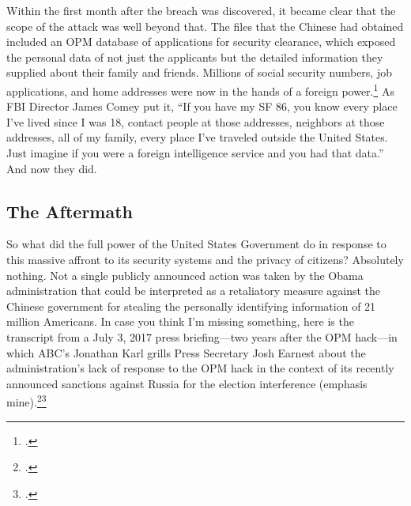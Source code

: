 \documentclass{report}
\begin{document}
\begin{refsegment}
Within the first month after the breach was discovered, it became clear that the scope of the attack was well beyond that. The files that the Chinese had obtained included an OPM database of applications for security clearance, which exposed the personal data of not just the applicants but the detailed information they supplied about their family and friends. Millions of social security numbers, job applications, and home addresses were now in the hands of a foreign power.\footcite{nakashima_hacks_2015} As FBI Director James Comey put it, ``If you have my SF 86, you know every place I've lived since I was 18, contact people at those addresses, neighbors at those addresses, all of my family, every place I've traveled outside the United States. Just imagine if you were a foreign intelligence service and you had that data.'' And now they did.

\subsection{The Aftermath}
So what did the full power of the United States Government do in response to this massive affront to its security systems and the privacy of citizens? Absolutely nothing. Not a single publicly announced action was taken by the Obama administration that could be interpreted as a retaliatory measure against the Chinese government for stealing the personally identifying information of 21 million Americans.  In case you think I'm missing something, here is the transcript from a July 3, 2017 press briefing---two years after the OPM hack---in which ABC's Jonathan Karl grills Press Secretary Josh Earnest about the administration's lack of response to the OPM hack in the context of its recently announced sanctions against Russia for the election interference (emphasis mine).\footcite[Transcript adapted from the official White House website.]{earnest_press_2017}\footcite[The full exchange goes on for about 5 minutes, and you can watch the entire video here. It's pretty awkward.]{gill_earnest_2017}


\end{refsegment}
\end{document}
